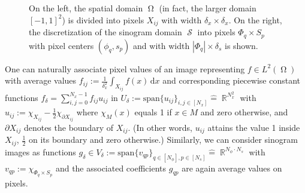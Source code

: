 \documentclass[11pt,reqno]{amsart}
\DeclareMathOperator{\RR}{\mathbb{R}}
\newcommand{\sumx}{\sum_{i,j=0}^{N_x-1}}
\DeclareMathOperator{\imgdom}{\Omega}
\DeclareMathOperator{\sinodom}{\mathcal{S}}
\newcommand{\dd}[1]{\,\mathrm{d}{#1}}
\numberwithin{theorem}{section}
\theoremstyle{remark}
\begin{document}
\begin{figure}


    \caption{On the left, the spatial domain  $\imgdom$ (in fact, the larger domain $[-1,1]^2$) is divided into pixels $X_{ij}$ with width $\delta_x\times \delta_x$. On the right, the discretization of the sinogram domain $\sinodom$ into pixels $\Phi_q\times S_p$ with pixel centers $(\phi_q,s_p)$ and  with width $|\Phi_q|\times \delta_s$ is shown.}
    \label{Fig_Geometry}
\end{figure}

One can naturally associate  pixel values of an image representing $f\in L^2(\imgdom)$ with average values $f_{ij}:=\frac{1}{\delta_x^2}\int_{X_{ij}}f(x) \dd x$ and corresponding piecewise constant functions $f_\delta = \sumx f_{ij} u_{ij}$ in $U_\delta:=\text{span}\{u_{ij}\}_{i,j\in[N_x]}\widehat = \RR^{N_x^2}$ with $u_{ij}:=\chi_{X_{ij}}-\frac 1 2 \chi_{\partial X_{ij}}$ where $\chi_M(x)$ equals 1 if $x\in M$  and zero otherwise, and  $\partial X_{ij}$ denotes the boundary of $X_{ij}$. (In other words, $u_{ij}$ attains the value 1 inside $X_{ij}$, $\frac{1}{2}$ on its boundary and zero otherwise.)
Similarly, we can consider sinogram images as functions $g_\delta \in V_\delta := \text{span}\{v_{qp}\}_{q\in [N_\phi],p\in [N_s]}\widehat = \RR^{N_\phi\cdot N_s}$ with $v_{qp}:=\chi_{\Phi_q\times S_p}$ and the associated coefficients $g_{qp}$ are again average values on pixels. 
\end{document}
